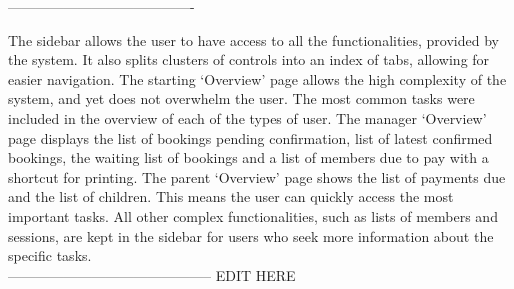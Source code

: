 \documentclass{l3proj}
\begin{document}
----------------------------------------
\par The sidebar allows the user to have access to all the functionalities, provided by the system. It also splits clusters of controls into an index of tabs, allowing for easier navigation. The starting `Overview’ page allows the high complexity of the system, and yet does not overwhelm the user. The most common tasks were included in the overview of each of the types of user. The manager `Overview' page displays the list of bookings pending confirmation, list of latest confirmed bookings, the waiting list of bookings and a list of members due to pay with a shortcut for printing. The parent `Overview’ page shows the list of payments due and the list of children. This means the user can quickly access the most important tasks. All other complex functionalities, such as lists of members and sessions, are kept in the sidebar for users who seek more information about the specific tasks.\\
--------------------------------------------
{\LARGE{EDIT HERE}}


\end{document}
